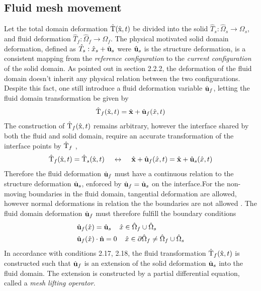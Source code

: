 \subsection{Fluid mesh movement}
 Let the total domain deformation $\text{\^{T}}(\text{\^{x}}, t)$ be divided into the solid $\hat{T}_s: \hat{\Omega}_s \rightarrow \Omega_s$, and fluid deformation $\hat{T}_f: \hat{\Omega}_f \rightarrow \Omega_f$. The physical motivated solid domain deformation, defined as $\hat{T}_s: \hat{x}_s + \hat{\mathbf{u}}_s$ were $\hat{\mathbf{u}}_s$ is the structure deformation, is 
a consistent mapping from the \textit{reference configuration} to the \textit{current configuration} of the solid domain. As pointed out in section 2.2.2, the deformation of the fluid domain doesn't inherit any physical relation between the two configurations. Despite this fact, one still introduce a fluid deformation variable $\hat{\mathbf{u}}_f$, letting the fluid domain transformation be given by 
\begin{align*}
\text{\^{T}}_f(\text{\^{x}}, t) = \hat{\mathbf{x}} + \hat{\mathbf{u}}_f(\hat{x}, t)
\end{align*}
The construction of $\text{\^{T}}_f(\text{\^{x}}, t) $ remains arbitrary, however the interface shared by both the fluid and solid domain, require an accurate transformation of the interface points by $\text{\^{T}}_f$ \cite{Richter2016}, 
\begin{align*}
\text{\^{T}}_f(\text{\^{x}}, t) = \text{\^{T}}_s(\text{\^{x}}, t) \hspace{4mm}  \leftrightarrow  
\hspace{4mm}\hat{\mathbf{x}} + \hat{\mathbf{u}}_f(\hat{x}, t) =  \hat{\mathbf{x}} + \hat{\mathbf{u}}_s(\hat{x}, t)
\end{align*}
Therefore the fluid deformation $\hat{\mathbf{u}}_f$ must have a continuous relation to the structure deformation $\hat{\mathbf{u}}_s$, enforced by $\hat{\mathbf{u}}_f = \hat{\mathbf{u}}_s$ on the interface.For the non-moving boundaries in the fluid domain, tangential deformation are allowed, however normal deformations in relation the the boundaries are not allowed \cite{Richter2010c}. The fluid domain deformation $\hat{\mathbf{u}}_f$ must therefore fulfill the boundary conditions 
\begin{align}
&\hat{\mathbf{u}}_f(\hat{x}) = \hat{\mathbf{u}}_s \hspace{4mm} \hat{x} \in \hat{\Omega}_f \cup  \hat{\Omega}_s \\
&\hat{\mathbf{u}}_f(\hat{x}) \cdot \hat{\mathbf{n}} = 0  \hspace{4mm}  \hat{x} \in \partial \hat{\Omega}_f \neq \hat{\Omega}_f \cup  \hat{\Omega}_s
\end{align} 
In accordance with conditions 2.17, 2.18, the fluid transformation $\text{\^{T}}_f(\text{\^{x}}, t) $ is constructed such that $\hat{\mathbf{u}}_f$ is an extension of the solid deformation $\hat{\mathbf{u}}_s$ into the fluid domain. The extension is constructed by a partial differential equation, called a \textit{mesh lifting operator}. 
